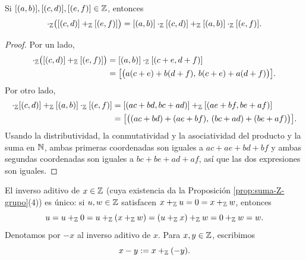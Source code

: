 \documentclass[12pt,a4paper]{book}
\begin{document}
    \begin{proposicion}
        \label{prop:distributividad-Z}
        Si $[(a,b)],[(c,d)],[(e,f)]\in\mathbb{Z}$, entonces
        \begin{equation*}
            [(a,b)]\cdot_{\Z}\big([(c,d)]+_{\Z}[(e,f)]\big) = [(a,b)]\cdot_{\Z}[(c,d)] +_{\Z} [(a,b)]\cdot_{\Z}[(e,f)].
        \end{equation*}
    \end{proposicion}
    \begin{proof}
        Por un lado,
        \begin{align*}
            [(a,b)]\cdot_{\Z}\big([(c,d)]+_{\Z}[(e,f)]\big) &= [(a,b)]\cdot_{\Z}[(c+e,d+f)] \\
            &= \big[\big(a(c+e)+b(d+f),\,b(c+e)+a(d+f)\big)\big].
        \end{align*}
        Por otro lado,
        \begin{align*}
            [(a,b)]\cdot_{\Z}[(c,d)] +_{\Z} [(a,b)]\cdot_{\Z}[(e,f)] &= [(ac+bd,bc+ad)] +_{\Z} [(ae+bf,be+af)] \\
            &= \big[\big((ac+bd)+(ae+bf),\,(bc+ad)+(be+af)\big)\big].
        \end{align*}
        Usando la distributividad, la conmutatividad y la asociatividad del producto y la suma en $\mathbb{N}$, ambas primeras coordenadas son iguales a $ac+ae+bd+bf$ y ambas segundas coordenadas son iguales a $bc+be+ad+af$, así que las dos expresiones son iguales.
    \end{proof}

    \begin{definicion}
        \label{def:resta-Z}
        El inverso aditivo de $x\in\mathbb{Z}$ (cuya existencia da la Proposición \ref{prop:suma-Z-grupo}(4)) es único: si $u,w\in\mathbb{Z}$ satisfacen $x+_{\mathbb{Z}}u=0=x+_{\mathbb{Z}}w$, entonces
        \begin{equation*}
            u = u+_{\mathbb{Z}}0 = u+_{\mathbb{Z}}(x+_{\mathbb{Z}}w) = (u+_{\mathbb{Z}}x)+_{\mathbb{Z}}w = 0+_{\mathbb{Z}}w = w.
        \end{equation*}
        Denotamos por $-x$ al inverso aditivo de $x$. Para $x,y\in\mathbb{Z}$, escribimos
        \begin{equation*}
            x-y := x+_{\mathbb{Z}}(-y).
        \end{equation*}
    \end{definicion}
\end{document}
